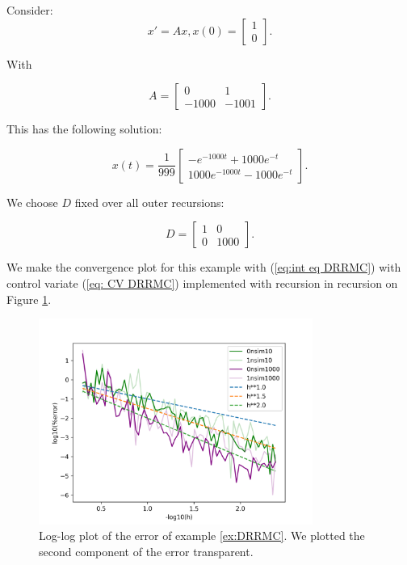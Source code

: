 \documentclass[a4paper,12pt]{article}
\begin{document}
\begin{example}[DRRMC] \label{ex:DRRMC}
    Consider:
    \begin{equation}
        x'= Ax, x(0)=
        \begin{bmatrix}
            1 \\
            0
        \end{bmatrix}.
    \end{equation}

    With

    \begin{equation}
        A = \begin{bmatrix}
            0     & 1     \\
            -1000 & -1001
        \end{bmatrix}.
    \end{equation}

    This has the following solution:

    \begin{equation}
        x(t) = \frac{1}{999}
        \begin{bmatrix}
            -  e^{-1000t}+ 1000 e^{-t} \\
            1000 e^{-1000t}- 1000e^{-t}
        \end{bmatrix}.
    \end{equation}

    We choose $D$ fixed over all outer recursions:

    \begin{equation}
        D = \begin{bmatrix}
            1 & 0    \\
            0 & 1000
        \end{bmatrix}.
    \end{equation}

    We make the convergence plot for this example with
    (\ref{eq:int eq DRRMC}) with control variate
    (\ref{eq: CV DRRMC}) implemented with recursion in recursion
    on Figure \ref{fig:DRRMC}.

    \begin{figure}[h!]
        \centering
        \includegraphics[width=0.8\textwidth]{plots/DRRMC.png}
        \caption{Log-log plot of the error of example \ref{ex:DRRMC}.
            We plotted the second component of the error transparent.
        }
        \label{fig:DRRMC}
    \end{figure}


\end{example}
\end{document}
